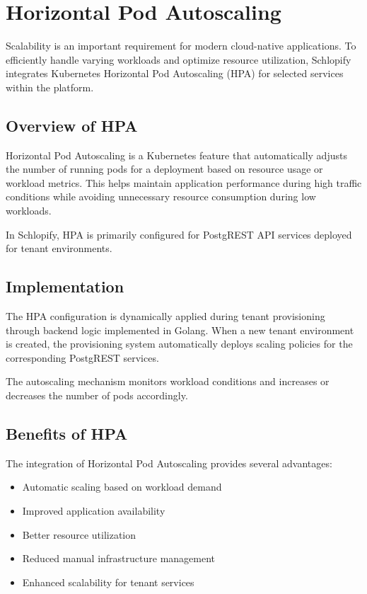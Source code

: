 \documentclass[12pt,a4paper]{report}
\begin{document}
\newpage


\chapter{Horizontal Pod Autoscaling}

Scalability is an important requirement for modern cloud-native applications. To efficiently handle varying workloads and optimize resource utilization, Schlopify integrates Kubernetes Horizontal Pod Autoscaling (HPA) for selected services within the platform.

\section{Overview of HPA}

Horizontal Pod Autoscaling is a Kubernetes feature that automatically adjusts the number of running pods for a deployment based on resource usage or workload metrics. This helps maintain application performance during high traffic conditions while avoiding unnecessary resource consumption during low workloads.

In Schlopify, HPA is primarily configured for PostgREST API services deployed for tenant environments.

\section{Implementation}

The HPA configuration is dynamically applied during tenant provisioning through backend logic implemented in Golang. When a new tenant environment is created, the provisioning system automatically deploys scaling policies for the corresponding PostgREST services.

The autoscaling mechanism monitors workload conditions and increases or decreases the number of pods accordingly.

\section{Benefits of HPA}

The integration of Horizontal Pod Autoscaling provides several advantages:

\begin{itemize}

    \item Automatic scaling based on workload demand
    \item Improved application availability
    \item Better resource utilization
    \item Reduced manual infrastructure management
    \item Enhanced scalability for tenant services

\end{itemize}
\end{document}
